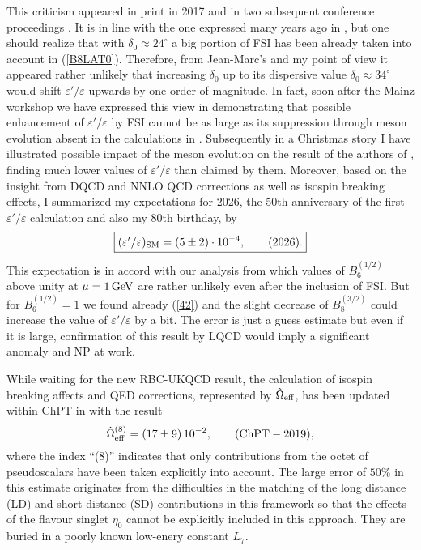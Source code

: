 \documentclass[12pt,a4paper]{article}
\newcommand{\gev}{\, {\rm GeV}}
\newcommand{\bsi}{B_6^{(1/2)}}
\newcommand{\bei}{B_8^{(3/2)}}
\def\epe{\varepsilon'/\varepsilon}
\newcommand{\be}{\begin{equation}}
\newcommand{\ee}{\end{equation}}
\begin{document}
This criticism appeared 
in print in 2017 \cite{Gisbert:2017vvj} and in two subsequent  conference proceedings \cite{Gisbert:2018tuf,Gisbert:2018niu}. 
It is in line with the one expressed many years ago in \cite{Antonelli:1995gw,Bertolini:1995tp,Pallante:1999qf,Pallante:2000hk,Buchler:2001np,Buchler:2001nm,Pallante:2001he}, but one should realize that with $\delta_0\approx 24^\circ$
a big portion of FSI has been already taken into account  in (\ref{B8LAT0}). Therefore, from Jean-Marc's and my point  of view it appeared rather unlikely
that increasing $\delta_0$ up to its dispersive  value 
$\delta_0\approx 34^\circ$ would shift $\epe$ upwards by one order of magnitude.
In fact, soon after the Mainz workshop we have expressed this view in \cite{Buras:2016fys} demonstrating
that possible enhancement of $\epe$ by FSI cannot be as large as its
suppression through meson evolution absent in the calculations in  \cite{Gisbert:2017vvj}. Subsequently in a Christmas story \cite{Buras:2018ozh} I have illustrated possible impact of the meson evolution on the result of the  authors of
\cite{Gisbert:2018tuf,Gisbert:2018niu},
finding much lower values of $\epe$ than claimed by them. Moreover, based on the insight from DQCD and NNLO QCD corrections
as well as isospin breaking effects, I summarized my expectations for 2026, the 50th anniversary of the first $\epe$ calculation and also my 80th birthday,
by
\be\label{AJBFINAL}
 \boxed{(\epe)_{\rm SM}= (5\pm2)\cdot 10^{-4},\qquad (2026).}
 \ee
 This expectation is in accord with our analysis \cite{Buras:2016fys} from
 which values of $\bsi$ above unity at $\mu=1\gev$ are rather unlikely even after
 the inclusion of FSI. But for $\bsi=1$ we found already (\ref{42}) and
 the slight decrease of $\bei$ could increase the value of $\epe$ by a bit. The
 error is just a guess estimate but even if it is large, confirmation of this result
 by LQCD would imply a significant anomaly and NP at work.

  

While waiting for the new RBC-UKQCD result, the calculation
of isospin breaking affects and QED corrections, represented by
$\hat\Omega_{\rm eff}$, has been updated within ChPT in 
 \cite{Cirigliano:2019cpi} with the result
\be\label{6.9}
  \hat\Omega_{\rm eff}^{(8)}=(17\pm9)\, 10^{-2}, \qquad (\text{ChPT}-2019),
  \ee
  where the index ``(8)'' indicates that only contributions from the octet
  of pseudoscalars have been taken explicitly into account. The large error of $50\%$ in this estimate originates from the difficulties in the matching of the long distance (LD)
  and short distance (SD) contributions in this framework so that the effects
  of the flavour singlet $\eta_0$ cannot be explicitly included in this
  approach. They are buried in a poorly known low-enery constant $L_7$.
\end{document}
